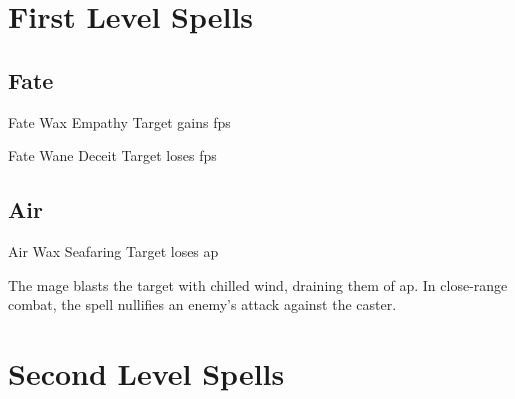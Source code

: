 \section{First Level Spells}

\begin{multicols}{2}

\subsection{Fate}

  {Fate}%
  {Wax}%
  {}%
  {Empathy}%
  {Target gains  \glspl{fp}}%

  {Fate}%
  {Wane}%
  {}%
  {Deceit}%
  {Target loses  \glspl{fp}}%

\subsection{Air}

  {Air}%
  {Wax}%
  {}%
  {Seafaring}%
  {Target loses  \gls{ap}}%

The mage blasts the target with chilled wind, draining them of  \gls{ap}.
In close-range combat, the spell nullifies an enemy's attack against the caster.

\end{multicols}

\section{Second Level Spells}

